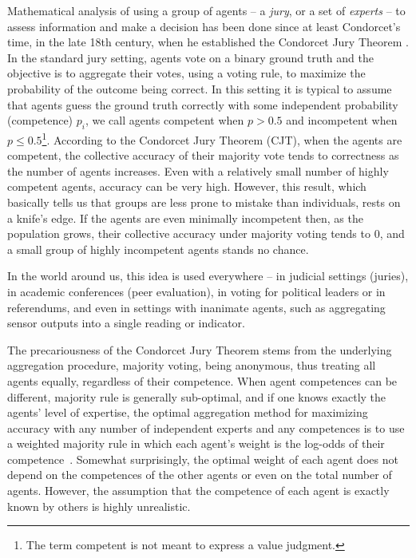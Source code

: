 \documentclass[letterpaper]{article} %
\begin{document}
Mathematical analysis of using a group of agents -- a \emph{jury}, or a set of \emph{experts} -- to assess information and make a decision has been done since at least Condorcet's time, in the late 18th century, when he established the Condorcet Jury Theorem \cite{de1785essai,sep-jury-theorems}. In the standard jury setting, agents vote on a binary ground truth and the objective is to aggregate their votes, using a voting rule, to maximize the probability of the outcome being correct. In this setting it is typical to assume that agents guess the ground truth correctly with some independent probability (competence) $p_i$, we call agents competent when $p > 0.5$ and incompetent when $p \leq 0.5$\footnote{The term competent is not meant to express a value judgment.}. 
According to the Condorcet Jury Theorem (CJT), when the agents are competent, the collective accuracy of their majority vote tends to correctness as the number of agents increases. Even with a relatively small number of highly competent agents, accuracy can be very high. However, this result, which basically tells us that groups are less prone to mistake than individuals, rests on a knife's edge. If the agents are even minimally incompetent then, as the population grows, their collective accuracy under majority voting tends to 0, and a small group of highly incompetent agents stands no chance.

In the world around us, this idea is used everywhere -- in judicial settings (juries), in academic conferences (peer evaluation), in voting for political leaders or in referendums, and even in settings with inanimate agents, such as aggregating sensor outputs into a single reading or indicator.

The precariousness of the Condorcet Jury Theorem stems from the underlying aggregation procedure, majority voting, being anonymous, thus treating all agents equally, regardless of their competence. When agent competences can be different, majority rule is generally sub-optimal, and if one knows exactly the agents' level of expertise, the optimal aggregation method for maximizing accuracy with any number of independent experts and any competences is to use a weighted majority rule in which each agent's weight is the log-odds of their competence~\cite{shapley1984optimizing,nitzan1982optimal}. Somewhat surprisingly, the optimal weight of each agent does not depend on the competences of the other agents or even on the total number of agents. However, the assumption that the competence of each agent is exactly known by others is highly unrealistic.
\end{document}
